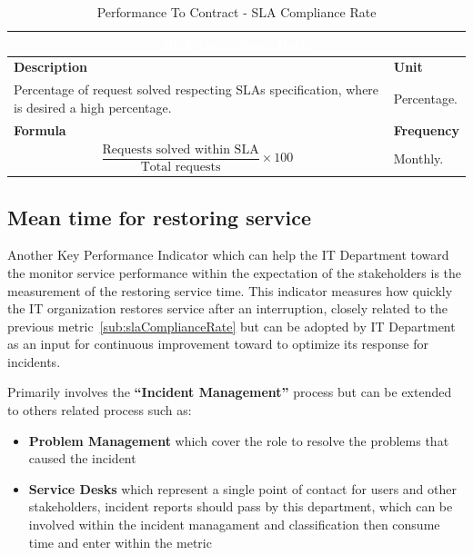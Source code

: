 \begin{table}[h]
    \centering
    \renewcommand{\arraystretch}{1.6}
    \setlength{\arrayrulewidth}{0.6pt}

    \begin{tabularx}{\textwidth}{|X|X|}
    \hline
    \multicolumn{2}{|c|}{\cellcolor{mcblue}\textcolor{white}{\textbf{SLA Compliance Rate}}} \\ \hline

    \rowcolor{mclightgray}
    \textbf{Description} & \textbf{Unit} \\ \hline
    Percentage of request solved respecting SLAs specification, where is desired a high percentage. &
    Percentage. \\ \hline

    \rowcolor{mclightgray}
    \textbf{Formula} & \textbf{Frequency} \\ \hline
    \[
        \frac{\text{Requests solved within SLA}}{\text{Total requests}} \times 100
    \]
     &
    Monthly. \\ \hline

    \end{tabularx}

    \caption{Performance To Contract - SLA  Compliance Rate}
    \label{tab:measurement_SLAComplianceRate}
\end{table}


\subsection{Mean time for restoring service}

Another Key Performance Indicator which can help the IT Department toward the monitor service performance within the expectation of the stakeholders is the measurement of the restoring service time.
This indicator measures how quickly the IT organization restores service after an interruption, closely related to the previous metric~\ref{sub:slaComplianceRate} but can be adopted by IT Department as an input for continuous improvement toward to optimize its response for incidents.

Primarily involves the \textbf{``Incident Management''} process but can be extended to others related process such as:
\begin{itemize}
    \item \textbf{Problem Management} which cover the role to resolve the problems that caused the incident
    \item \textbf{Service Desks} which represent a single point of contact for users and other stakeholders, incident reports should pass by this department, which can be involved within the incident managament and classification then consume time and enter within the metric
\end{itemize}

